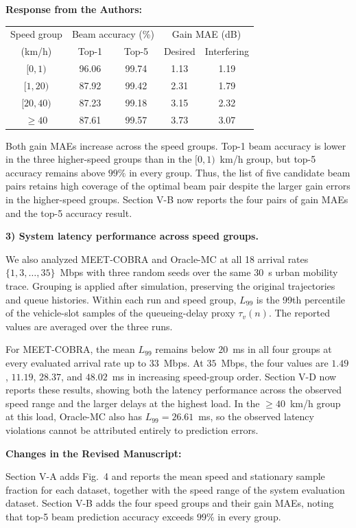 \documentclass[11pt]{article}
\newenvironment{reviewedit}[1]
{\colorlet{responseblue}{#1}\colorlet{changeblue}{#1}\color{#1}}
{}
\newenvironment{authorresponse}
{\par\Needspace{3\baselineskip}\noindent\textcolor{responseblue}{\textbf{Response from the Authors:}}\par\nobreak\color{responseblue}}
{\par}
\newenvironment{manuscriptchanges}
{\par\noindent\textcolor{changeblue}{\textbf{Changes in the Revised Manuscript:}}\par\color{changeblue}}
{\par}
\begin{document}
\begin{reviewedit}{blue}
\begin{authorresponse}
\begin{center}
\small
\begin{tabular}{ccccc}
\hline
Speed group & \multicolumn{2}{c}{Beam accuracy (\%)} & \multicolumn{2}{c}{Gain MAE (dB)} \\
(km/h) & Top-1 & Top-5 & Desired & Interfering \\
\hline
$[0,1)$ & 96.06 & 99.74 & 1.13 & 1.19 \\
$[1,20)$ & 87.92 & 99.42 & 2.31 & 1.79 \\
$[20,40)$ & 87.23 & 99.18 & 3.15 & 2.32 \\
$\geq40$ & 87.61 & 99.57 & 3.73 & 3.07 \\
\hline
\end{tabular}
\end{center}

Both gain MAEs increase across the speed groups. Top-1 beam accuracy is
lower in the three higher-speed groups than in the $[0,1)$~km/h group, but top-5
accuracy remains above $99\%$ in every group. Thus, the list of five candidate beam pairs
retains high coverage of the optimal beam pair despite the larger gain
errors in the higher-speed groups. Section V-B now reports the four pairs
of gain MAEs and the top-5 accuracy result.

\textbf{3) System latency performance across speed groups.}

We also analyzed MEET-COBRA and Oracle-MC at all 18 arrival rates
$\{1,3,\ldots,35\}$~Mbps with three random seeds over the same $30$~s urban
mobility trace. Grouping is applied after simulation, preserving the
original trajectories and queue histories. Within each run and speed group,
$L_{99}$ is the 99th percentile of the vehicle-slot samples of the
queueing-delay proxy $\tau_v(n)$. The reported values are averaged over the
three runs.

For MEET-COBRA, the mean $L_{99}$ remains below $20$~ms in all four groups
at every evaluated arrival rate up to $33$~Mbps. At $35$~Mbps, the four
values are $1.49$, $11.19$, $28.37$, and $48.02$~ms in increasing
speed-group order. Section V-D now reports these results, showing both the
latency performance across the observed speed range and the larger delays
at the highest load. In the $\geq40$~km/h group at this load, Oracle-MC
also has $L_{99}=26.61$~ms, so the observed latency violations cannot be
attributed entirely to prediction errors.

\end{authorresponse}
\begin{manuscriptchanges}
Section V-A adds Fig.~4 and reports the mean speed and stationary sample
fraction for each dataset, together with the speed range of the system
evaluation dataset. Section V-B
adds the four speed groups and their gain MAEs, noting that top-5 beam
prediction accuracy exceeds $99\%$ in every group.


\end{manuscriptchanges}
\end{reviewedit}
\end{document}

